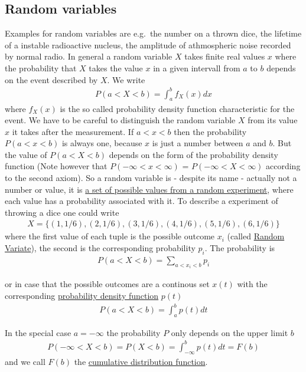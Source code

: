 \subsection{Random variables}
Examples for random variables are e.g.~the number on a thrown dice, the
lifetime of a instable radioactive nucleus, the amplitude of
athmospheric noise recorded by normal radio. In general a random
variable $X$ takes finite real values $x$ where the probability that
$X$ takes the value $x$ in a given intervall from $a$ to $b$
depends on the event described by $X$. We write 
\begin{align}
P(a < X < b) = \int_a^b f_X(x) dx 
\end{align} 
where $f_X(x)$ is the so called probability density function
characteristic for the event. We have to be careful to distinguish the
random variable $X$ from its value $x$ it takes after the
measurement. If $a < x < b$ then the probability $P(a < x < b)$ is
always one, because $x$ is just a number between $a$ and $b$. But
the value of $P(a < X < b)$ depends on the form of the probability
density function (Note however that $P(-\infty < x < \infty)$ =
$P(-\infty < X < \infty)$ according to the second axiom). So a random
variable is - despite its name - actually not a number or value, it is
\href{https://www.mathsisfun.com/data/random-variables.html}{a set of
possible values from a random experiment}, where each value has a
probability associated with it. To describe a experiment of throwing a
dice one could write 
\begin{align}
X = \{(1,1/6),(2,1/6),(3,1/6),(4,1/6),(5,1/6),(6,1/6)\}
\end{align} 
where the first value of each tuple is the possible outcome $x_i$
(called \href{https://en.wikipedia.org/wiki/Random_variate}{Random
Variate}), the second is the corresponding probability $p_i$. The
probability is 
\begin{align}
P(a < X < b) = \sum_{a < x_i < b} p_i  
\end{align}

or in case that the possible outcomes are a continous set $x(t)$ with
the corresponding
\href{https://en.wikipedia.org/wiki/Probability_density_function}{probability
density function} $p(t)$ 
\begin{align}
P(a < X < b) = \int_a^b p(t) dt  
\end{align}

In the special case $a=-\infty$ the probability $P$ only depends on
the upper limit $b$ 
\begin{align}
P(-\infty < X < b) = P(X < b) = \int_{-\infty}^b p(t) dt = F(b)  
\end{align} 
and we call $F(b)$ the
\href{https://en.wikipedia.org/wiki/Cumulative_distribution_function}{cumulative
distribution function}.

